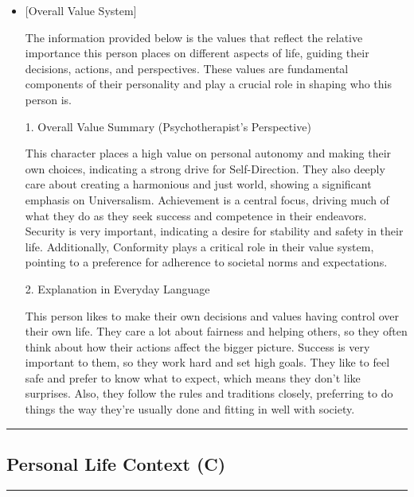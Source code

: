 \begin{itemize}
\item

[Overall Value System]

The information provided below is the values that reflect the relative importance this person places on different aspects of life, guiding their decisions, actions, and perspectives. These values are fundamental components of their personality and play a crucial role in shaping who this person is.

1. Overall Value Summary (Psychotherapist’s Perspective)

This character places a high value on personal autonomy and making their own choices, indicating a strong drive for Self-Direction. They also deeply care about creating a harmonious and just world, showing a significant emphasis on Universalism. Achievement is a central focus, driving much of what they do as they seek success and competence in their endeavors. Security is very important, indicating a desire for stability and safety in their life. Additionally, Conformity plays a critical role in their value system, pointing to a preference for adherence to societal norms and expectations.

2. Explanation in Everyday Language

This person likes to make their own decisions and values having control over their own life. They care a lot about fairness and helping others, so they often think about how their actions affect the bigger picture. Success is very important to them, so they work hard and set high goals. They like to feel safe and prefer to know what to expect, which means they don't like surprises. Also, they follow the rules and traditions closely, preferring to do things the way they're usually done and fitting in well with society.
\end{itemize}

\noindent\rule{\columnwidth}{0.3mm}
\subsection{Personal Life Context (C)}
\label{sec:appendix_profile_example_C_A3}

\noindent\rule{\columnwidth}{0.3mm}

